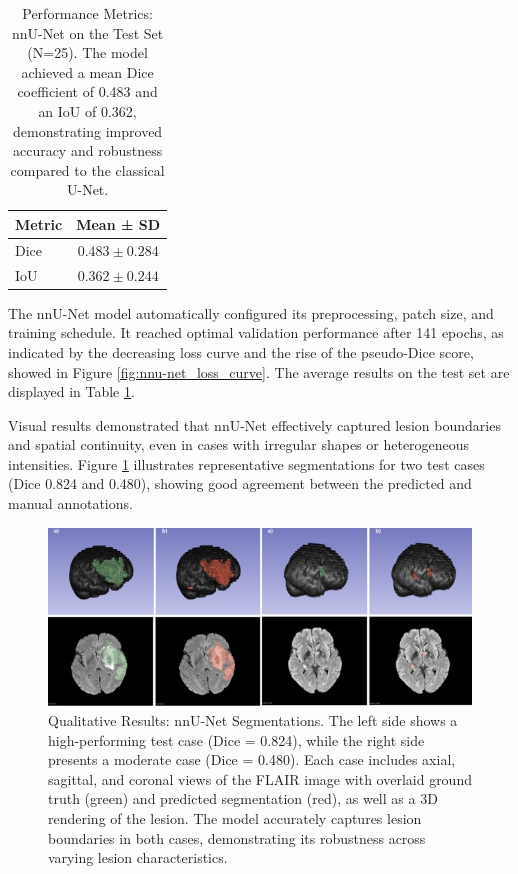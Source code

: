 \documentclass[12pt]{article}
\begin{document}
\begin{table}[tp]
\centering
\begin{tabular}{lc}
\toprule
\textbf{Metric} & \textbf{Mean ± SD} \\
\midrule
Dice & $0.483 \pm 0.284$ \\
IoU & $0.362 \pm 0.244$ \\
\bottomrule
\end{tabular}
\caption{Performance Metrics: nnU-Net on the Test Set (N=25). The model achieved a mean Dice coefficient of 0.483 and an IoU of 0.362, demonstrating improved accuracy and robustness compared to the classical U-Net.}
\label{tab:nnunet_metrics}
\end{table}

The nnU-Net model automatically configured its preprocessing, patch size, and training schedule. It reached optimal validation performance after 141 epochs, as indicated by the decreasing loss curve and the rise of the pseudo-Dice score, showed in Figure \ref{fig:nnu-net_loss_curve}. The average results on the test set are displayed in Table \ref{tab:nnunet_metrics}.

Visual results demonstrated that nnU-Net effectively captured lesion boundaries and spatial continuity, even in cases with irregular shapes or heterogeneous intensities. Figure \ref{fig:nnunet_qualitative} illustrates representative segmentations for two test cases (Dice 0.824 and 0.480), showing good agreement between the predicted and manual annotations.

\begin{figure}[tp]    
    \centering
    \includegraphics[width=\textwidth]{figures/Figure 4.jpg}
    \caption{Qualitative Results: nnU-Net Segmentations. The left side shows a high-performing test case (Dice = 0.824), while the right side presents a moderate case (Dice = 0.480). Each case includes axial, sagittal, and coronal views of the FLAIR image with overlaid ground truth (green) and predicted segmentation (red), as well as a 3D rendering of the lesion. The model accurately captures lesion boundaries in both cases, demonstrating its robustness across varying lesion characteristics.}
    \label{fig:nnunet_qualitative}
\end{figure}
\end{document}
